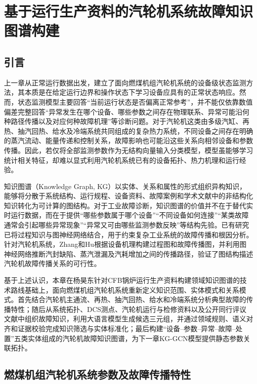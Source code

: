\section{基于运行生产资料的汽轮机系统故障知识图谱构建}
\label{sec:knowledge_graph}

\subsection{引言}

上一章从正常运行数据出发，建立了面向燃煤机组汽轮机系统的设备级状态监测方法，其本质是在给定运行边界和操作状态下学习设备应具有的正常状态响应。然而，状态监测模型主要回答“当前运行状态是否偏离正常参考”，并不能仅依靠数值偏差完整回答“异常发生在哪个设备、哪些参数之间存在物理联系、异常可能沿何种路径传播以及对应何种故障机理”等诊断问题。对于汽轮机这类由多级汽缸、再热、抽汽回热、给水及冷端系统共同组成的复杂热力系统，不同设备之间存在明确的蒸汽流动、能量传递和控制关系，故障影响也可能沿这些关系向相邻设备和参数传播。因此，若仅将全部监测参数作为无结构向量输入分类模型，模型虽能够学习统计相关特征，却难以显式利用汽轮机系统已有的设备拓扑、热力机理和运行经验。

知识图谱（Knowledge Graph, KG）以实体、关系和属性的形式组织异构知识，能够将分散于系统结构、运行规程、设备资料、故障案例和学术文献中的非结构化知识转化为可计算的图结构\cite{Hogan2021KnowledgeGraphs}。对于工业故障诊断，知识图谱的价值并不在于替代实时运行数据，而在于提供“哪些参数属于哪个设备”“不同设备如何连接”“某类故障通常会引起哪些异常现象”“异常又可由哪些监测参数反映”等结构先验。已有研究已将过程知识与图神经网络结合，用于约束复杂工业系统的故障传播和根因分析\cite{Han2022KnowledgeEnhancedGNN}。针对汽轮机系统，Zhang和Hu根据设备机理构建过程图和故障传播图，并利用图神经网络推断汽封缺陷、蒸汽泄漏及汽耗增加之间的传播路径，验证了图结构描述汽轮机故障传播关系的可行性\cite{ZhangHu2021FaultPropagationGNN}。

基于上述认识，本章在杨昊东针对CFB锅炉运行生产资料构建领域知识图谱的技术路线基础上\cite{YangHaodong2026CFB}，面向燃煤机组汽轮机系统重新定义知识范围、实体模式和关系模式。首先结合汽轮机主通流、再热、抽汽回热、给水和冷端系统分析典型故障的传播特性；随后从系统拓扑、DCS测点、汽轮机运行与检修资料以及公开同行评议文献中组织故障知识，利用大语言模型生成候选三元组，并通过领域规则、语义对齐和证据校验完成知识筛选与实体标准化；最后构建“设备--参数--异常--故障--处置”五类实体组成的汽轮机故障知识图谱，为下一章KG-GCN模型提供静态参数关联拓扑。

\subsection{燃煤机组汽轮机系统参数及故障传播特性}
\label{subsec:turbine_fault_characteristics}

